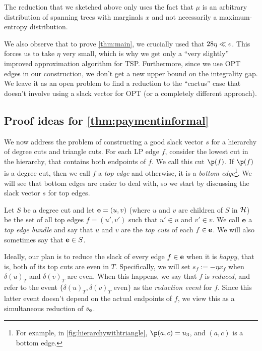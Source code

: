  The reduction that we sketched above only uses the fact that $\mu$ is an arbitrary distribution of spanning trees with marginals $x$ and not necessarily a maximum-entropy distribution.
 
 We also observe that to prove \cref{thm:main}, we crucially used that $28 \eta \ll {\epsilon}$.  This forces us to take $\eta$ very small, which is why we get only a ``very slightly'' improved approximation algorithm for TSP. Furthermore, since we use OPT edges in our construction, we don't get a new upper bound on the integrality gap.  We leave it as an open problem to find a reduction to the ``cactus'' case that doesn't involve using a slack vector for OPT (or a completely different approach).

 
 
 \subsection{Proof ideas for \cref{thm:paymentinformal}}
 
 We now address the problem of constructing a good slack vector $s$ for a hierarchy of degree cuts and triangle cuts.
 For each LP edge $f$, consider the lowest cut in the hierarchy, that contains both endpoints of $f$. We call this cut $\p(f)$.
 If $\p(f)$ is a degree cut, then we call $f$ a {\em top edge} and otherwise, it is a {\em bottom edge}\footnote{For example, in \cref{fig:hierarchywithtriangle}, $\p(a,c) = u_3$, and $(a,c)$ is a bottom edge.}. We will see that bottom edges are easier to deal with, so we start by discussing the slack vector $s$ for top edges.
  
 Let $S$ be a degree cut and let ${\bf e} = (u,v)$ (where $u$ and $v$ are children of $S$ in $\mathcal{H}$) be the set of all top edges $f = (u', v')$ such that $u' \in u$ and $v' \in v$. We call ${\bf e}$ a {\em top edge bundle} and say that $u$ and $v$ are the {\em top cuts} of each $f \in {\bf e}$. We will also sometimes say that ${\bf e} \in S$.
 
 Ideally, our plan is to reduce the slack of every edge $f \in {\bf e}$ when it is {\em happy}, that is, both of its top cuts are even in $T$. Specifically, we will set  $s_f := -\eta x_f$ when  $\delta(u)_T$ and $ \delta(v)_T $ are even. When this happens, we say that $f$ is {\em reduced}, and refer to the event $\{\delta(u)_T,\delta(v)_T\text{ even}\}$ as the {\em reduction event} for $f$.
 Since this latter event doesn't depend on the actual endpoints of $f$, we view this as a simultaneous reduction of $s_{\bf e}$. 
 
